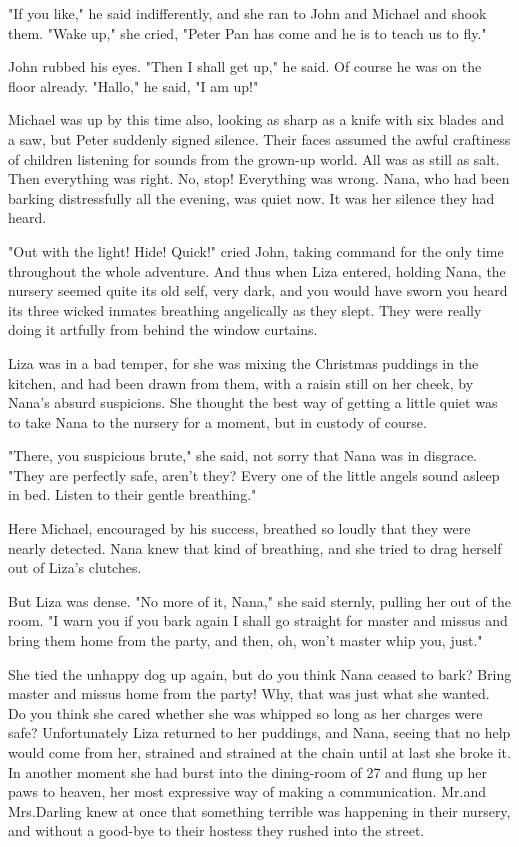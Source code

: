 "If you like," he said indifferently, and she ran to John and Michael and shook them.
"Wake up," she cried, "Peter Pan has come and he is to teach us to fly."

John rubbed his eyes.
"Then I shall get up," he said.
Of course he was on the floor already.
"Hallo," he said, "I am up!"

Michael was up by this time also, looking as sharp as a knife with six blades and a saw,
but Peter suddenly signed silence.
Their faces assumed the awful craftiness of children listening for sounds from the grown-up world.
All was as still as salt.
Then everything was right.
No, stop!
Everything was wrong.
Nana, who had been barking distressfully all the evening, was quiet now.
It was her silence they had heard.

"Out with the light!
Hide!
Quick!\@" cried John, taking command for the only time throughout the whole adventure.
And thus when Liza entered, holding Nana, the nursery seemed quite its old self, very dark,
and you would have sworn you heard its three wicked inmates breathing angelically as they slept.
They were really doing it artfully from behind the window curtains.

Liza was in a bad temper, for she was mixing the Christmas puddings in the kitchen,
and had been drawn from them, with a raisin still on her cheek, by Nana's absurd suspicions.
She thought the best way of getting a little quiet was to take Nana to the nursery for a moment,
but in custody of course.

"There, you suspicious brute," she said, not sorry that Nana was in disgrace.
"They are perfectly safe, aren't they?
Every one of the little angels sound asleep in bed.
Listen to their gentle breathing."

Here Michael, encouraged by his success, breathed so loudly that they were nearly detected.
Nana knew that kind of breathing, and she tried to drag herself out of Liza's clutches.

But Liza was dense.
"No more of it, Nana," she said sternly, pulling her out of the room.
"I warn you if you bark again I shall go straight for master and missus and bring them home from the party,
and then, oh, won't master whip you, just."

She tied the unhappy dog up again, but do you think Nana ceased to bark?
Bring master and missus home from the party!
Why, that was just what she wanted.
Do you think she cared whether she was whipped so long as her charges were safe?
Unfortunately Liza returned to her puddings,
and Nana, seeing that no help would come from her, strained and strained at the chain until at last she broke it.
In another moment she had burst into the dining-room of 27 and flung up her paws to heaven,
her most expressive way of making a communication.
Mr.\@ and Mrs.\@ Darling knew at once that something terrible was happening in their nursery,
and without a good-bye to their hostess they rushed into the street.


